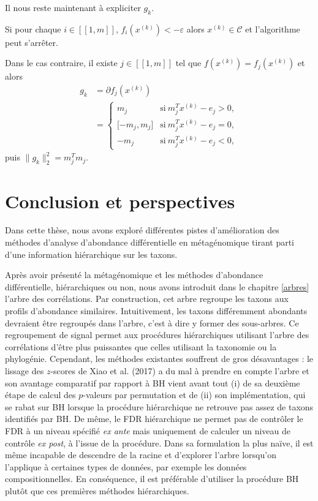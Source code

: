 \documentclass[12pt,a4paper]{reedthesis}
\theoremstyle{definition}
\theoremstyle{definition}
\theoremstyle{definition}
\theoremstyle{remark}
\begin{document}
Il nous reste maintenant à expliciter \(g_k\).

Si pour chaque \(i \in [\![1,m]\!]\), \(f_i\left(x^{(k)}\right) < -\varepsilon\) alors \(x^{(k)} \in \mathcal{C}\) et l'algorithme peut s'arrêter.

Dans le cas contraire, il existe \(j\in [\![1,m]\!]\) tel que \(f\left(x^{(k)}\right) = f_j\left(x^{(k)}\right)\) et alors
\begin{equation*}
\begin{aligned}
g_k & = \partial f_j\left(x^{(k)}\right) \\
& = 
  \begin{cases}
  m_j & \text{si}\ m_j^Tx^{(k)} - e_j > 0,\\
  \mathopen[-m_j, m_j\mathclose] & \text{si}\ m_j^Tx^{(k)} - e_j = 0,\\
  -m_j & \text{si}\ m_j^Tx^{(k)} - e_j < 0,
  \end{cases}
\end{aligned}
\end{equation*}
puis \(\|g_k\|_2^2 = m_j^Tm_j\).

\hypertarget{conclusion-et-perspectives}{%
\chapter*{Conclusion et perspectives}\label{conclusion-et-perspectives}}

Dans cette thèse, nous avons exploré différentes pistes d'amélioration des méthodes d'analyse d'abondance différentielle en métagénomique tirant parti d'une information hiérarchique sur les taxons.

Après avoir présenté la métagénomique et les méthodes d'abondance différentielle, hiérarchiques ou non, nous avons introduit dans le chapitre \ref{arbres} l'arbre des corrélations. Par construction, cet arbre regroupe les taxons aux profils d'abondance similaires. Intuitivement, les taxons différemment abondants devraient être regroupés dans l'arbre, c'est à dire y former des sous-arbres. Ce regroupement de signal permet aux procédures hiérarchiques utilisant l'arbre des corrélations d'être plus puissantes que celles utilisant la taxonomie ou la phylogénie. Cependant, les méthodes existantes souffrent de gros désavantages : le lissage des \(z\)-scores de Xiao et al. (2017) a du mal à prendre en compte l'arbre et son avantage comparatif par rapport à BH vient avant tout (i) de sa deuxième étape de calcul des \(p\)-valeurs par permutation et de (ii) son implémentation, qui se rabat sur BH lorsque la procédure hiérarchique ne retrouve pas assez de taxons identifiés par BH. De même, le FDR hiérarchique ne permet pas de contrôler le FDR à un niveau spécifié \emph{ex ante} mais uniquement de calculer un niveau de contrôle \emph{ex post}, à l'issue de la procédure. Dans sa formulation la plus naïve, il est même incapable de descendre de la racine et d'explorer l'arbre lorsqu'on l'applique à certaines types de données, par exemple les données compositionnelles. En conséquence, il est préférable d'utiliser la procédure BH plutôt que ces premières méthodes hiérarchiques.
\end{document}
